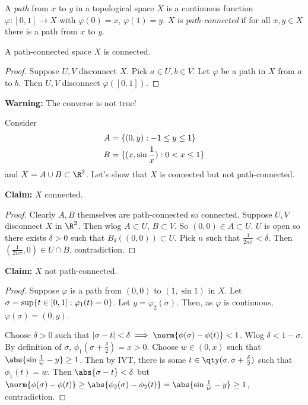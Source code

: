 \begin{definition}
A \emph{path} from $x$ to $y$ in a topological space $X$ is a continuous function $\varphi:[0,1]\to X$ with $\varphi(0) = x$, $\varphi(1) = y$. $X$ is \emph{path-connected} if for all $x,y\in X$ there is a path from $x$ to $y$.
\end{definition}

\begin{proposition}                                     %
A path-connected space $X$ is connected.
\end{proposition}
\begin{proof}
Suppose $U,V$ disconnect $X$. Pick $a\in U, b\in V$. Let $\varphi$ be a path in $X$ from $a$ to $b$. Then $U,V$ disconnect $\varphi([0,1])$.
\end{proof}

\textbf{\color{red} Warning:} The converse is not true!
\begin{example}
Consider 
\begin{align*}
    A &= \{(0,y) : -1\leq y \leq 1\}\\
    B &= \{(x,\sin \frac{1}{x}) : 0< x\leq 1\}
\end{align*}
and $X = A\cup B \subset \R^2$. Let's show that $X$ is connected but not path-connected.
\end{example}
\textbf{\color{red} Claim:} $X$ connected.
\begin{proof}
Clearly $A,B$ themselves are path-connected so connected. Suppose $U,V$ disconnect $X$ in $\R^2$. Then wlog $A\subset U$, $B\subset V$. So $(0,0)\in A\subset U$. $U$ is open so there exists $\delta>0$ such that $B_\delta((0,0))\subset U$. Pick $n$ such that $\frac{1}{2n\pi}<\delta$. Then $(\frac{1}{2n\pi},0)\in U\cap B$, contradiction.
\end{proof}
\textbf{\color{red} Claim:} $X$ not path-connected.
\begin{proof}
Suppose $\varphi$ is a path from $(0,0)$ to $(1,\sin 1)$ in $X$. Let $\sigma = \sup\{t\in [0,1] : \varphi_1(t) = 0\}$. Let $y = \varphi_2(\sigma).$ Then, as $\varphi$ is continuous, $\varphi(\sigma) = (0,y)$.

Choose $\delta > 0$ such that $|\sigma - t| <\delta \implies \norm{\phi(\sigma) - \phi(t)} < 1$. Wlog $\delta < 1-\sigma$. By definition of $\sigma$, $\phi_1(\sigma + \frac{\delta}{2}) = x > 0$. Choose $w\in (0,x)$ such that $\abs{\sin \frac{1}{w} - y} \geq 1$. Then by IVT, there is some $t\in \qty(\sigma, \sigma +\frac{\delta}{2})$ such that $\phi_1(t) = w$. Then $\abs{\sigma - t} < \delta$ but $\norm{\phi(\sigma) - \phi(t)} \geq \abs{\phi_2(\sigma) - \phi_2(t)} = \abs{\sin\frac{1}{w} - y} \geq 1$, contradiction.
\end{proof}

